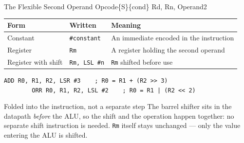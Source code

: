 \documentclass[9pt,aspectratio=169,xcolor=table]{beamer}
\newcommand{\striped}{\rowcolors{1}{white}{stripe}}
\begin{document}
\begin{frame}[fragile]{The Flexible Second Operand}
	\leavevmode
	{\ttfamily\large Opcode\{S\}\{cond\} \quad Rd, \quad Rn, \quad Operand2}

	\vspace{2mm}
	\begin{center}
		{\small
			\striped
			\begin{tabular}{@{}l l R{.44\textwidth}@{}}
				\toprule
				\textbf{Form} & \textbf{Written} & \textbf{Meaning} \\
				\midrule
				Constant & \texttt{\#constant} & An immediate encoded in the instruction \\
				Register & \texttt{Rm} & A register holding the second operand \\
				Register with shift & \texttt{Rm, LSL \#n} & \texttt{Rm} shifted before use \\
				\bottomrule
		\end{tabular}}
	\end{center}

	\vspace{2mm}
	\begin{lstlisting}[style=armasm, language=ARM]
		ADD R0, R1, R2, LSR #3    ; R0 = R1 + (R2 >> 3)
		ORR R0, R1, R2, LSL #2    ; R0 = R1 | (R2 << 2)
	\end{lstlisting}

	\vspace{2mm}
	\begin{block}{Folded into the instruction, not a separate step}
		{\small The \alert{barrel shifter} sits in the datapath \emph{before}
			the ALU, so the shift and the operation happen together: no
			separate shift instruction is needed. \texttt{Rm} itself stays
			\alert{unchanged} --- only the value entering the ALU is
			shifted.}
	\end{block}
\end{frame}


\end{document}
